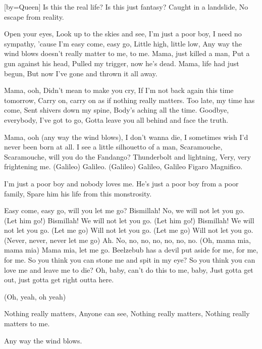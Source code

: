[by={Queen}]
\beginverse*\singlespacing
Is this the real life?
Is this just fantasy?
Caught in a landslide,
No escape from reality.

Open your eyes,
Look up to the skies and see,
I'm just a poor boy, I need no sympathy,
'cause I'm easy come, easy go,
Little high, little low,
Any way the wind blows doesn't really matter to me, to me.
\endverse
\beginverse*\singlespacing
Mama, just killed a man,
Put a gun against his head,
Pulled my trigger, now he's dead.
Mama, life had just begun,
But now I've gone and thrown it all away.

Mama, ooh,
Didn't mean to make you cry,
If I'm not back again this time tomorrow,
Carry on, carry on as if nothing really matters.
\endverse
\beginverse*\singlespacing
Too late, my time has come,
Sent shivers down my spine,
Body's aching all the time.
Goodbye, everybody, I've got to go,
Gotta leave you all behind and face the truth.

Mama, ooh (any way the wind blows),
I don't wanna die,
I sometimes wish I'd never been born at all.
\endverse
\beginverse*\singlespacing
I see a little silhouetto of a man,
Scaramouche, Scaramouche, will you do the Fandango?
Thunderbolt and lightning,
Very, very frightening me.
(Galileo) Galileo.
(Galileo) Galileo,
Galileo Figaro
Magnifico.

I'm just a poor boy and nobody loves me.
He's just a poor boy from a poor family,
Spare him his life from this monstrosity.

Easy come, easy go, will you let me go?
Bismillah! No, we will not let you go.
(Let him go!) Bismillah! We will not let you go.
(Let him go!) Bismillah! We will not let you go.
(Let me go) Will not let you go.
(Let me go) Will not let you go.
(Never, never, never let me go) Ah.
No, no, no, no, no, no, no.
(Oh, mama mia, mama mia) Mama mia, let me go.
Beelzebub has a devil put aside for me, for me, for me.
\endverse
\beginverse*\singlespacing
So you think you can stone me and spit in my eye?
So you think you can love me and leave me to die?
Oh, baby, can't do this to me, baby,
Just gotta get out, just gotta get right outta here.

(Oh, yeah, oh yeah)

Nothing really matters,
Anyone can see,
Nothing really matters,
Nothing really matters to me.

Any way the wind blows.
\endverse
\endsong